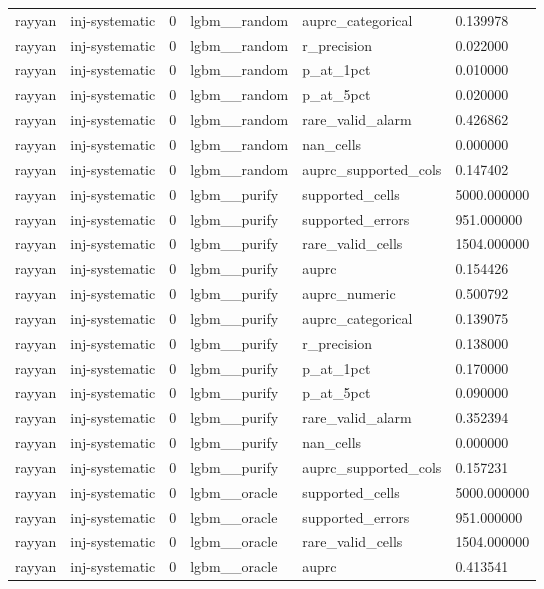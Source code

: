\begin{tabular}{llllll}
rayyan & inj-systematic & 0 & lgbm\_\_random & auprc\_categorical & 0.139978 \\
rayyan & inj-systematic & 0 & lgbm\_\_random & r\_precision & 0.022000 \\
rayyan & inj-systematic & 0 & lgbm\_\_random & p\_at\_1pct & 0.010000 \\
rayyan & inj-systematic & 0 & lgbm\_\_random & p\_at\_5pct & 0.020000 \\
rayyan & inj-systematic & 0 & lgbm\_\_random & rare\_valid\_alarm & 0.426862 \\
rayyan & inj-systematic & 0 & lgbm\_\_random & nan\_cells & 0.000000 \\
rayyan & inj-systematic & 0 & lgbm\_\_random & auprc\_supported\_cols & 0.147402 \\
rayyan & inj-systematic & 0 & lgbm\_\_purify & supported\_cells & 5000.000000 \\
rayyan & inj-systematic & 0 & lgbm\_\_purify & supported\_errors & 951.000000 \\
rayyan & inj-systematic & 0 & lgbm\_\_purify & rare\_valid\_cells & 1504.000000 \\
rayyan & inj-systematic & 0 & lgbm\_\_purify & auprc & 0.154426 \\
rayyan & inj-systematic & 0 & lgbm\_\_purify & auprc\_numeric & 0.500792 \\
rayyan & inj-systematic & 0 & lgbm\_\_purify & auprc\_categorical & 0.139075 \\
rayyan & inj-systematic & 0 & lgbm\_\_purify & r\_precision & 0.138000 \\
rayyan & inj-systematic & 0 & lgbm\_\_purify & p\_at\_1pct & 0.170000 \\
rayyan & inj-systematic & 0 & lgbm\_\_purify & p\_at\_5pct & 0.090000 \\
rayyan & inj-systematic & 0 & lgbm\_\_purify & rare\_valid\_alarm & 0.352394 \\
rayyan & inj-systematic & 0 & lgbm\_\_purify & nan\_cells & 0.000000 \\
rayyan & inj-systematic & 0 & lgbm\_\_purify & auprc\_supported\_cols & 0.157231 \\
rayyan & inj-systematic & 0 & lgbm\_\_oracle & supported\_cells & 5000.000000 \\
rayyan & inj-systematic & 0 & lgbm\_\_oracle & supported\_errors & 951.000000 \\
rayyan & inj-systematic & 0 & lgbm\_\_oracle & rare\_valid\_cells & 1504.000000 \\
rayyan & inj-systematic & 0 & lgbm\_\_oracle & auprc & 0.413541 \\

\end{tabular}

